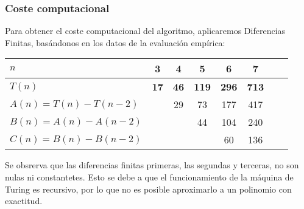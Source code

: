\subsubsection*{Coste computacional}
Para obtener el coste computacional del algoritmo, aplicaremos Diferencias Finitas, basándonos en los datos de la evaluación empírica:


\begin{table}[h]
    \centering
    \begin{tabular}{|l|c|c|c|c|c|c|c|}
        \hline
        $n$ & \textbf{3} & \textbf{4} & \textbf{5} & \textbf{6} & \textbf{7}\\ \hline
        $T(n)$ & \textbf{17} & \textbf{46} & \textbf{119} & \textbf{296} & \textbf{713}      \\ \hline
        \hline
        $A(n) = T(n) - T(n-2)$ &    & 29 & 73 & 177 & 417 \\ \hline
        $B(n) = A(n) - A(n-2)$ &    &   & 44 & 104 & 240 \\ \hline
        $C(n) = B(n) - B(n-2)$ &    &   &    & 60 & 136 \\ \hline
    \end{tabular}
\end{table}

Se obsrerva que las diferencias finitas primeras, las segundas y terceras, no son nulas ni constantetes. Esto se debe a que el funcionamiento de la máquina de Turing es recursivo, por lo que no es posible aproximarlo a un polinomio con exactitud.\\

